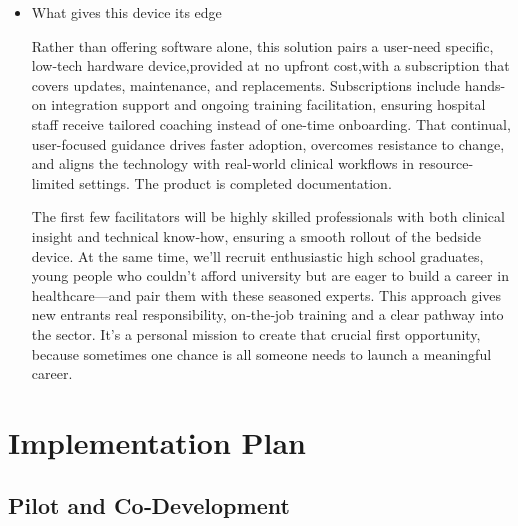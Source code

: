 \documentclass[a4paper,11pt]{article}
\begin{document}
\begin{itemize}
 \item What gives this device its edge

Rather than offering software alone, this solution pairs a user-need specific, low-tech hardware device,provided at no upfront cost,with a subscription that covers updates, maintenance, and replacements. Subscriptions include hands-on integration support and ongoing training facilitation, ensuring hospital staff receive tailored coaching instead of one-time onboarding. That continual, user-focused guidance drives faster adoption, overcomes resistance to change, and aligns the technology with real-world clinical workflows in resource-limited settings. The product is completed documentation.

The first few facilitators will be highly skilled professionals with both clinical insight and technical know‑how, ensuring a smooth rollout of the bedside device. At the same time, we’ll recruit enthusiastic high school graduates, young people who couldn’t afford university but are eager to build a career in healthcare—and pair them with these seasoned experts. This approach gives new entrants real responsibility, on‑the‑job training and a clear pathway into the sector. It’s a personal mission to create that crucial first opportunity, because sometimes one chance is all someone needs to launch a meaningful career.

\end{itemize}


\newpage
\section{Implementation Plan}
\subsection{Pilot and Co‐Development}
\end{document}
